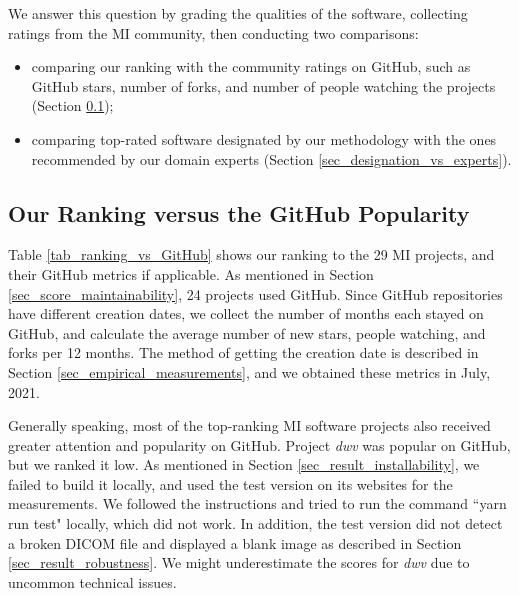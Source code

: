 We answer this question by grading the qualities of the software, collecting ratings from the MI community, then conducting two comparisons:
\begin{itemize}
\item comparing our ranking with the community ratings on GitHub, such as GitHub stars, number of forks, and number of people watching the projects (Section \ref{sec_ranking_vs_github});
\item comparing top-rated software designated by our methodology with the ones recommended by our domain experts (Section \ref{sec_designation_vs_experts}).
\end{itemize}

\subsection{Our Ranking versus the GitHub Popularity}
\label{sec_ranking_vs_github}

Table \ref{tab_ranking_vs_GitHub} shows our ranking to the 29 MI projects, and their GitHub metrics if applicable. As mentioned in Section \ref{sec_score_maintainability}, 24 projects used GitHub. Since GitHub repositories have different creation dates, we collect the number of months each stayed on GitHub, and calculate the average number of new stars, people watching, and forks per 12 months. The method of getting the creation date is described in Section \ref{sec_empirical_measurements}, and we obtained these metrics in July, 2021.

Generally speaking, most of the top-ranking MI software projects also received greater attention and popularity on GitHub. Project \textit{dwv} was popular on GitHub, but we ranked it low. As mentioned in Section \ref{sec_result_installability}, we failed to build it locally, and used the test version on its websites for the measurements. We followed the instructions and tried to run the command ``yarn run test" locally, which did not work. In addition, the test version did not detect a broken DICOM file and displayed a blank image as described in Section \ref{sec_result_robustness}. We might underestimate the scores for \textit{dwv} due to uncommon technical issues.

